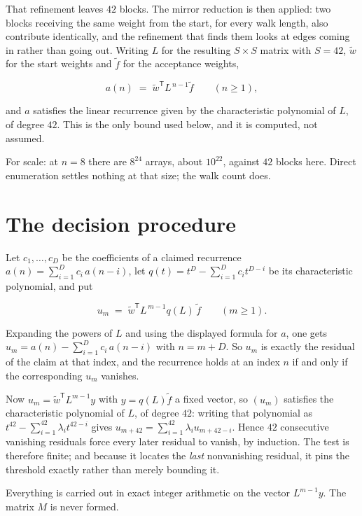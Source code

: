 \documentclass[11pt]{article}
\theoremstyle{definition}
\begin{document}
That refinement leaves $42$ blocks. The mirror reduction is then applied: two blocks receiving the same weight from the start, for every walk length, also contribute identically, and the refinement that finds them looks at edges coming in rather than going out. Writing $L$ for the resulting $S \times S$ matrix with $S = 42$, $\tilde w$ for the start weights and $\tilde f$ for the acceptance weights,

\[a(n) \;=\; \tilde w^{\mathsf T} L^{\,n-1} \tilde f \qquad (n \ge 1),\]

and $a$ satisfies the linear recurrence given by the characteristic polynomial of $L$, of degree $42$. This is the only bound used below, and it is computed, not assumed.

For scale: at $n = 8$ there are $8^{24}$ arrays, about $10^{22}$, against $42$ blocks here. Direct enumeration settles nothing at that size; the walk count does.

\section{The decision procedure}

Let $c_1,\dots,c_D$ be the coefficients of a claimed recurrence $a(n) = \sum_{i=1}^{D} c_i\,a(n-i)$, let $q(t) = t^{D} - \sum_{i=1}^{D} c_i t^{D-i}$ be its characteristic polynomial, and put

\[u_m \;=\; \tilde w^{\mathsf T} L^{\,m-1} q(L)\,\tilde f \qquad (m \ge 1).\]

Expanding the powers of $L$ and using the displayed formula for $a$, one gets $u_m = a(n) - \sum_{i=1}^{D} c_i\,a(n-i)$ with $n = m + D$. So $u_m$ is exactly the residual of the claim at that index, and the recurrence holds at an index $n$ if and only if the corresponding $u_m$ vanishes.

Now $u_m = \tilde w^{\mathsf T} L^{m-1} y$ with $y = q(L)\tilde f$ a fixed vector, so $(u_m)$ satisfies the characteristic polynomial of $L$, of degree $42$: writing that polynomial as $t^{42} - \sum_{i=1}^{42} \lambda_i t^{42-i}$ gives $u_{m+42} = \sum_{i=1}^{42} \lambda_i u_{m+42-i}$. Hence $42$ consecutive vanishing residuals force every later residual to vanish, by induction. The test is therefore finite; and because it locates the {\itshape last} nonvanishing residual, it pins the threshold exactly rather than merely bounding it.

Everything is carried out in exact integer arithmetic on the vector $L^{m-1}y$. The matrix $M$ is never formed.
\end{document}
